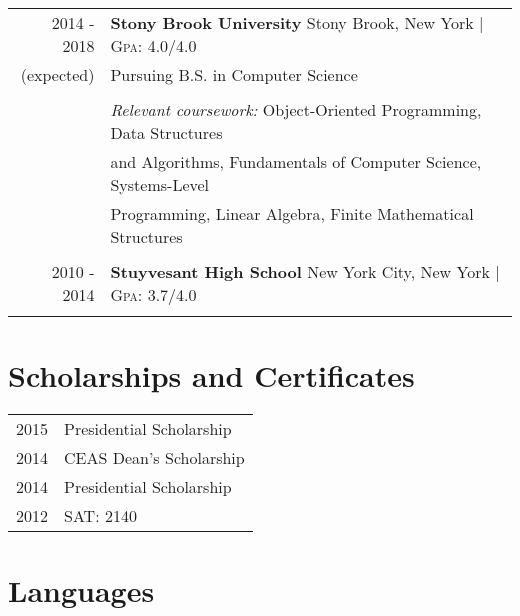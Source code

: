 \documentclass[letterpaper,10pt]{article} %
\begin{document}
\begin{tabular}{rl}	
\textsc{2014 - 2018} & \textbf{Stony Brook University} Stony Brook, New York | \normalsize \textsc{Gpa}: 4.0/4.0\\
\textsc(expected) & Pursuing B.S. in Computer Science\\
\\
& \textit{Relevant coursework:} Object-Oriented Programming, Data Structures\\
& and Algorithms, Fundamentals of Computer Science, Systems-Level\\
& Programming, Linear Algebra, Finite Mathematical Structures\\

&\\


\textsc{2010 - 2014} & \textbf{Stuyvesant High School} New York City, New York | \normalsize \textsc{Gpa}: 3.7/4.0\\
&\\

\end{tabular}


\section{Scholarships and Certificates}

\begin{tabular}{rl}
\textsc{2015} & Presidential Scholarship \normalsize\\

\textsc{2014} & CEAS Dean's Scholarship \normalsize\\

\textsc{2014} & Presidential Scholarship \normalsize\\

\textsc{2012} & SAT: 2140
\end{tabular}


\section{Languages}
\end{document}
